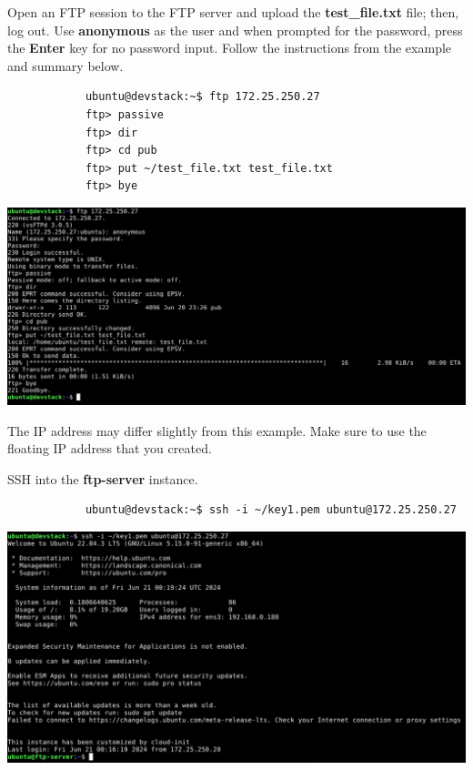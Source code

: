 \documentclass[letterpaper, 12pt]{article}
\begin{document}
\begin{enumerate}
    \begin{labstep}
        Open an FTP session to the FTP server and upload the \textbf{test\_file.txt} file; then, log out.
        Use \textbf{anonymous} as the user and when prompted for the password, press the \textbf{Enter} key for no password input.
        Follow the instructions from the example and summary below.
        \begin{lstlisting}
            ubuntu@devstack:~$ ftp 172.25.250.27
            ftp> passive
            ftp> dir
            ftp> cd pub
            ftp> put ~/test_file.txt test_file.txt
            ftp> bye
        \end{lstlisting}

        \begin{center}
            \includegraphics[width=\linewidth]{images/part2/step19.png}
        \end{center}
    \end{labstep}

    \begin{notebox}
        The IP address may differ slightly from this example.
        Make sure to use the floating IP address that you created.
    \end{notebox}

    \begin{labstep}
        SSH into the \textbf{ftp-server} instance.
        \begin{lstlisting}
            ubuntu@devstack:~$ ssh -i ~/key1.pem ubuntu@172.25.250.27
        \end{lstlisting}

        \begin{center}
            \includegraphics[width=\linewidth]{images/part2/step20.png}
        \end{center}
    \end{labstep}


\end{enumerate}
\end{document}
